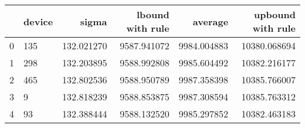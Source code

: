 \begin{tabular}{llrrrr}
\toprule
{} & device &       sigma &  lbound with rule &      average &  upbound with rule \\
\midrule
0 &    135 &  132.021270 &       9587.941072 &  9984.004883 &       10380.068694 \\
1 &    298 &  132.203895 &       9588.992808 &  9985.604492 &       10382.216177 \\
2 &    465 &  132.802536 &       9588.950789 &  9987.358398 &       10385.766007 \\
3 &      9 &  132.818239 &       9588.853875 &  9987.308594 &       10385.763312 \\
4 &     93 &  132.388444 &       9588.132520 &  9985.297852 &       10382.463183 \\
\bottomrule
\end{tabular}
